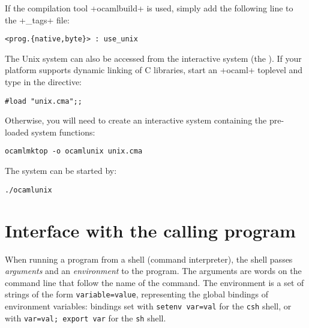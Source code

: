 If the compilation tool  \ml+ocamlbuild+ is used, simply add the
following line to the 
\ml+_tags+ file:
%
\begin{lstlisting}
<prog.{native,byte}> : use_unix
\end{lstlisting}
%
The Unix system can also be accessed from the interactive system (the
). If your platform supports dynamic linking of C
libraries, start an \ml+ocaml+ toplevel and type in the directive:
%
\begin{lstlisting}
#load "unix.cma";;
\end{lstlisting}
%
Otherwise, you will need to create an interactive system containing
the pre-loaded system functions:
%
\begin{lstlisting}
ocamlmktop -o ocamlunix unix.cma
\end{lstlisting}
%
The system can be started by:
\begin{lstlisting}
./ocamlunix
\end{lstlisting}

\section{Interface with the calling program}

When running a program from a shell (command interpreter), the shell
passes \emph{arguments} and an \emph{environment} to the program.  The
arguments are words on the command line that follow the name of the
command. The environment is a set of strings of the form
\texttt{variable=value}, representing the global bindings of environment
variables: bindings set with \texttt{setenv var=val} for the
\texttt{csh} shell, or with \texttt{var=val; export var} for
the \texttt{sh} shell.

